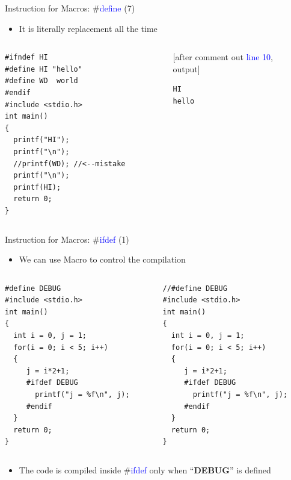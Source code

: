 \begin{frame}[fragile]{Instruction for Macros: \#\textcolor{blue}{define} (7)}
\begin{itemize}
	\item {It is literally replacement all the time}
\end{itemize}
\begin{columns}
\begin{column}{0.46\linewidth}
\begin{lstlisting}
#ifndef HI
#define HI "hello"
#define WD	world
#endif
#include <stdio.h>
int main()
{
  printf("HI");
  printf("\n");
  //printf(WD); //<--mistake
  printf("\n");
  printf(HI);
  return 0;
}
\end{lstlisting}
\end{column}
\begin{column}{0.35\linewidth}

[after comment out \textcolor{blue}{line 10},\\output]
\begin{lstlisting}
HI
hello
\end{lstlisting}
\end{column}
\end{columns}
\end{frame}

\begin{frame}[fragile]{Instruction for Macros: \#\textcolor{blue}{ifdef} (1)}
\begin{itemize}
	\item {We can use Macro to control the compilation}
\end{itemize}
\vspace{-0.1in}
\begin{columns}
\begin{column}{0.48\linewidth}
\begin{lstlisting}
#define DEBUG
#include <stdio.h>
int main()
{
  int i = 0, j = 1;
  for(i = 0; i < 5; i++)
  {
     j = i*2+1;
     #ifdef DEBUG
       printf("j = %f\n", j);
     #endif
  }
  return 0;
}
\end{lstlisting}
\end{column}
\begin{column}{0.48\linewidth}
\begin{lstlisting}
//#define DEBUG
#include <stdio.h>
int main()
{
  int i = 0, j = 1;
  for(i = 0; i < 5; i++)
  {
     j = i*2+1;
     #ifdef DEBUG
       printf("j = %f\n", j);
     #endif
  }
  return 0;
}
\end{lstlisting}
\end{column}
\end{columns}
\vspace{-0.2in}
\begin{itemize}
	\item {The code is compiled inside \#\textcolor{blue}{ifdef} only when ``\textbf{DEBUG}'' is defined}
\end{itemize}
\end{frame}

